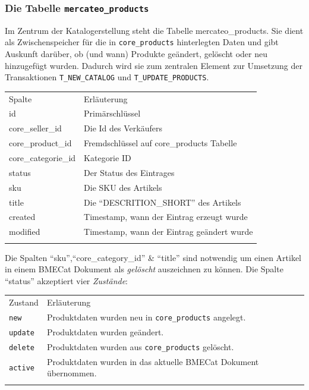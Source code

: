 	\subsubsection{Die Tabelle \texttt{mercateo\_products}}

	Im Zentrum der Katalogerstellung steht die Tabelle mercateo\_products. Sie dient als Zwischenspeicher für die in \texttt{core\_products} hinterlegten Daten und gibt Auskunft darüber, ob (und wann) Produkte geändert, gelöscht oder neu hinzugefügt wurden. Dadurch wird sie zum zentralen Element zur Umsetzung der Transaktionen \texttt{T\_NEW\_CATALOG} und \texttt{T\_UPDATE\_PRODUCTS}. 
	
	\begin{table}[!htbp]
		\begin{tabularx}{\textwidth}{p{4cm} X}
		\rowcolor[HTML]{EFEFEF} 
		Spalte & Erläuterung \\ \cline{1-2} \addlinespace[7pt]
		id & Primärschlüssel \\
		core\_seller\_id & Die Id des Verkäufers \\
		core\_product\_id & Fremdschlüssel auf core\_products Tabelle \\
		core\_categorie\_id & Kategorie ID  \\
		status & Der Status des Eintrages \\
		sku & Die SKU des Artikels \\
		title & Die \enquote{DESCRITION\_SHORT} des Artikels  \\ 
		created & Timestamp, wann der Eintrag erzeugt wurde  \\
		modified & Timestamp, wann der Eintrag geändert wurde  \\\addlinespace[7pt] \cline{1-2} 
		\end{tabularx}%
	\end{table}
	
	Die Spalten \enquote{sku},\enquote{core\_category\_id} \& \enquote{title} sind notwendig um einen Artikel in einem BMECat Dokument als \textit{gelöscht} auszeichnen zu können. Die Spalte \enquote{status} akzeptiert vier  \textit{Zustände}: 
	

	\begin{tabularx}{\textwidth}{p{3cm} X}
	\rowcolor[HTML]{EFEFEF} 
	Zustand & Erläuterung \\ \cline{1-2} \addlinespace[7pt]
	\texttt{new} & Produktdaten wurden neu in \texttt{core\_products} angelegt. \\
	\texttt{update} & Produktdaten wurden geändert. \\
	\texttt{delete} & Produktdaten wurden aus \texttt{core\_products} gelöscht. \\
	\texttt{active} & Produktdaten wurden in das aktuelle BMECat Dokument übernommen. \\
	   \addlinespace[7pt] \cline{1-2} 
	\end{tabularx}%
		
